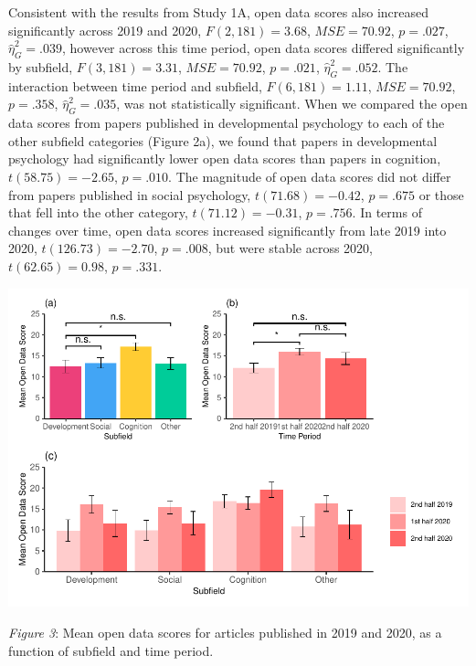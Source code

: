\documentclass[
  english,
  man]{apa6}
\begin{document}
Consistent with the results from Study 1A, open data scores also increased significantly across 2019 and 2020, \(F(2, 181) = 3.68\), \(\mathit{MSE} = 70.92\), \(p = .027\), \(\hat{\eta}^2_G = .039\), however across this time period, open data scores differed significantly by subfield, \(F(3, 181) = 3.31\), \(\mathit{MSE} = 70.92\), \(p = .021\), \(\hat{\eta}^2_G = .052\). The interaction between time period and subfield, \(F(6, 181) = 1.11\), \(\mathit{MSE} = 70.92\), \(p = .358\), \(\hat{\eta}^2_G = .035\), was not statistically significant. When we compared the open data scores from papers published in developmental psychology to each of the other subfield categories (Figure 2a), we found that papers in developmental psychology had significantly lower open data scores than papers in cognition, \(t(58.75) = -2.65\), \(p = .010\). The magnitude of open data scores did not differ from papers published in social psychology, \(t(71.68) = -0.42\), \(p = .675\) or those that fell into the other category, \(t(71.12) = -0.31\), \(p = .756\). In terms of changes over time, open data scores increased significantly from late 2019 into 2020, \(t(126.73) = -2.70\), \(p = .008\), but were stable across 2020, \(t(62.65) = 0.98\), \(p = .331\).

\includegraphics{icd_special_issue_files/figure-latex/1B-d-plots-1.pdf}

\emph{Figure 3}: Mean open data scores for articles published in 2019 and 2020, as a function of subfield and time period.
\end{document}

